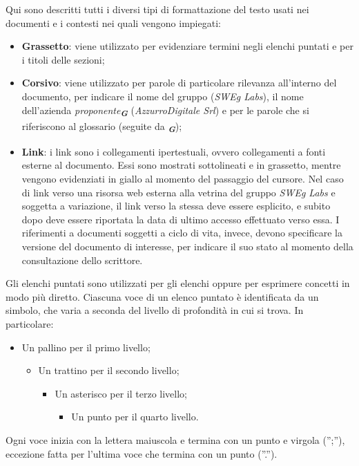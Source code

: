 Qui sono descritti tutti i diversi tipi di formattazione del testo usati nei documenti e i contesti
nei quali vengono impiegati:
\begin{itemize}
    \item \textbf{Grassetto}: viene utilizzato per evidenziare termini negli elenchi puntati e per i titoli
    delle sezioni;
    \item \textbf{Corsivo}: viene utilizzato per parole di particolare rilevanza all’interno del documento, 
    per indicare il nome del gruppo (\emph{SWEg Labs}), il nome dell’azienda \emph{proponente}\textsubscript{\textit{\textbf{G}}} 
    (\emph{AzzurroDigitale Srl}) e per le parole che si riferiscono al glossario (seguite da \textsubscript{\textit{\textbf{G}}});
    \item \textbf{Link}: i link sono i collegamenti ipertestuali, ovvero collegamenti a fonti esterne al
    documento. Essi sono mostrati sottolineati e in grassetto, mentre vengono evidenziati in giallo
    al momento del passaggio del cursore. Nel caso di link verso una risorsa web esterna alla vetrina del gruppo
    \emph{SWEg Labs} e soggetta a variazione, il link verso la stessa deve essere esplicito, e subito dopo deve essere riportata la data di
    ultimo accesso effettuato verso essa. I riferimenti a documenti soggetti a ciclo di vita, invece, devono specificare la versione del
    documento di interesse, per indicare il suo stato al momento della consultazione dello scrittore.
\end{itemize}

Gli elenchi puntati sono utilizzati per gli elenchi oppure per esprimere concetti in modo più
diretto. Ciascuna voce di un elenco puntato è identificata da un simbolo, che varia a seconda
del livello di profondità in cui si trova. In particolare:
\begin{itemize}
    \item Un pallino per il primo livello;
    \begin{itemize}
        \item Un trattino per il secondo livello;
        \begin{itemize}
            \item Un asterisco per il terzo livello;
            \begin{itemize}
                \item Un punto per il quarto livello.
            \end{itemize}
        \end{itemize}
    \end{itemize}
\end{itemize}
Ogni voce inizia con la lettera maiuscola e termina con un punto e virgola (”;”), eccezione
fatta per l’ultima voce che termina con un punto (”.”).

